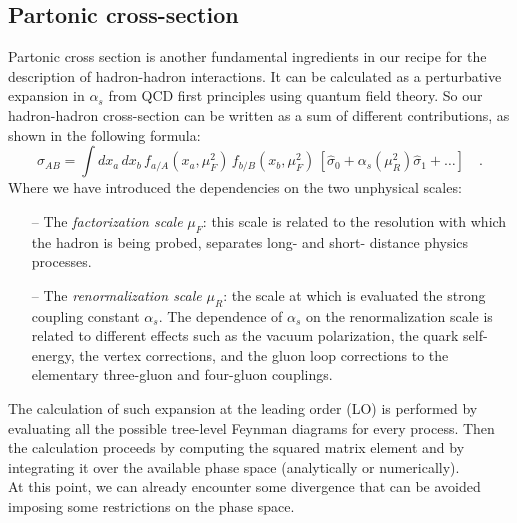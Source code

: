 %
%

\subsection{Partonic cross-section}

Partonic cross section is another fundamental ingredients in our recipe for the description of hadron-hadron interactions. It can be calculated as a perturbative expansion in $\alpha_s$ from QCD first principles using quantum field theory. So our hadron-hadron cross-section can be written as a sum of different contributions, as shown in the following formula:
\begin{equation}
	\sigma_{AB}=\displaystyle\int dx_a\,dx_b\,f_{a/A}(x_a,\mu_F^2)\,f_{b/B}(x_b,\mu_F^2)\,\left[\hat{\sigma}_0+\alpha_s(\mu_R^2)\hat{\sigma}_1+\dots\right]\quad .
\label{eq:factorization3}
\end{equation}
Where we have introduced the dependencies on the two unphysical scales:
\begin{itemize}
	\item[--] The \textit{factorization scale} $\mu_F$: this scale is related to the resolution with which the hadron is being probed, separates long- and short- distance physics processes.
	\item[--] The \textit{renormalization scale} $\mu_R$: the scale at which is evaluated the strong coupling constant $\alpha_s$. The dependence of $\alpha_s$ on the renormalization scale is related to different effects such as  the vacuum polarization, the quark self-energy, the vertex corrections, and the gluon loop corrections to the elementary three-gluon and four-gluon couplings.
\end{itemize}
The calculation of such expansion at the leading order (LO) is performed by evaluating all the possible tree-level Feynman diagrams for every process. Then the calculation proceeds by computing the squared matrix element and by integrating it over the available phase space (analytically or numerically).
\\
At this point, we can already encounter some divergence that can be avoided imposing some  restrictions on the phase space.

